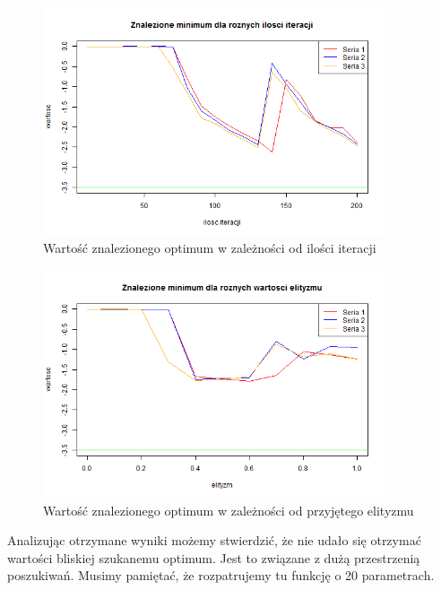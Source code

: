 \documentclass[11pt, a4paper]{article}
\newcommand{\fbi}{\leavevmode{\parindent=1em\indent}}
\begin{document}
\begin{figure}[H]
	\begin{center}
		\includegraphics[width=0.9\textwidth]{./assets/Zeldasine205.png}
		\caption{Wartość znalezionego optimum w zależności od ilości iteracji}
		\label{fig:zeldasine5}
	\end{center}
\end{figure}


\begin{figure}[H]
	\begin{center}
		\includegraphics[width=0.9\textwidth]{./assets/Zeldasine206.png}
		\caption{Wartość znalezionego optimum w zależności od przyjętego elityzmu}
		\label{fig:zeldasine6}
	\end{center}
\end{figure}

\fbi
Analizując otrzymane wyniki możemy stwierdzić, że nie udało się otrzymać wartości bliskiej szukanemu optimum. Jest to związane z dużą przestrzenią poszukiwań. Musimy pamiętać, że rozpatrujemy tu funkcję o 20 parametrach.
\end{document}
